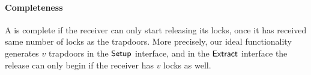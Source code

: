 
\paragraph{Completeness} A \sysname is complete if the receiver can only start releasing its locks,
once it has received same number of locks as the trapdoors. More precisely, our ideal functionality 
generates $v$ trapdoors in the $\mathsf{Setup}$ interface, and in the $\mathsf{Extract}$ interface the release can 
only begin if the receiver has $v$ locks as well.

